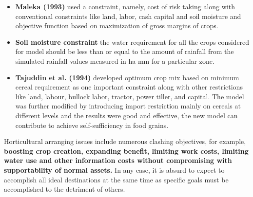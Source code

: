 \documentclass[conference]{IEEEtran}
\begin{document}
\begin{itemize}
    \item {\textbf{Maleka (1993)} used a constraint, namely, cost of risk taking along with conventional constraints like land, labor, cash capital and soil moisture and objective function based on maximization of gross margins of crops.}
    \item {\textbf{Soil moisture constraint} the water requirement for all the crops considered for model should be less than or equal to the amount of rainfall from the simulated rainfall values measured in ha-mm for a particular zone. }
    \item {\textbf{Tajuddin et al. (1994)} developed optimum crop mix based on minimum cereal requirement as one important constraint along with other restrictions like land, labour, bullock labor, tractor, power tiller, and capital. The model was further modified by introducing import restriction mainly on cereals at different levels and the results were good and effective, the new model can contribute to achieve self-sufficiency in food grains.}
\end{itemize}
Horticultural arranging issues include numerous clashing objectives, for example, \textbf{boosting crop creation, expanding benefit, limiting work costs, limiting water use and other information costs without compromising with supportability of normal assets.} In any case, it is absurd to expect to accomplish all ideal destinations at the same time as specific goals must be accomplished to the detriment of others.
\end{document}
